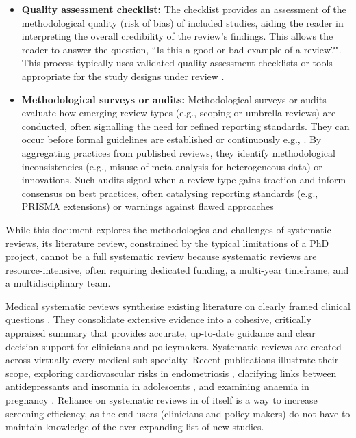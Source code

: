 \documentclass[10pt,oneside]{book}
\begin{document}
\begin{itemize}
    \item {\bf{Quality assessment checklist:}} The checklist provides an assessment of the methodological quality (risk of bias) of included studies, aiding the reader in interpreting the overall credibility of the review's findings. This allows the reader to answer the question, ``Is this a good or bad example of a review?". This process typically uses validated quality assessment checklists or tools appropriate for the study designs under review \cite{whiting_proposed_2017}.
    \item {\bf{Methodological surveys or audits:}} Methodological surveys or audits evaluate how emerging review types (e.g., scoping or umbrella reviews) are conducted, often signalling the need for refined reporting standards. They can occur before formal guidelines are established or continuously e.g., \cite{dalton_potential_2017, france_methodological_2014}. By aggregating practices from published reviews, they identify methodological inconsistencies (e.g., misuse of meta-analysis for heterogeneous data) or innovations. Such audits signal when a review type gains traction and inform consensus on best practices, often catalysing reporting standards (e.g., PRISMA extensions) or warnings against flawed approaches \cite{tricco_prisma_2018, sarkis-onofre_how_2021,rethlefsen_prisma-s_2021, rethlefsen_prisma-s_2021-1}
\end{itemize}

While this document explores the methodologies and challenges of systematic reviews, its literature review, constrained by the typical limitations of a PhD project, cannot be a full systematic review because systematic reviews are resource-intensive, often requiring dedicated funding, a multi-year timeframe, and a multidisciplinary team.

Medical systematic reviews synthesise existing literature on clearly framed clinical questions \cite{kranke_evidence-based_2010, higgins_cochrane_2019}. They consolidate extensive evidence into a cohesive, critically appraised summary that provides accurate, up-to-date guidance and clear decision support for clinicians and policymakers. Systematic reviews are created across virtually every medical sub-specialty. Recent publications illustrate their scope, exploring cardiovascular risks in endometriosis \cite{parsa_endometriosis_2025}, clarifying links between antidepressants and insomnia in adolescents \cite{turkmen_systematic_2025}, and examining anaemia in pregnancy \cite{azzam_anemia_2025}. Reliance on systematic reviews in of itself is a way to increase screening efficiency, as the end-users (clinicians and policy makers) do not have to maintain knowledge of the ever-expanding list of new studies.
\end{document}
